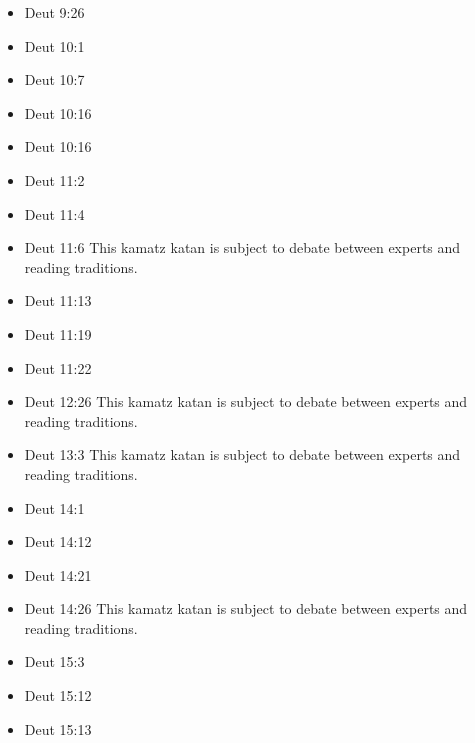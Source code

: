 \documentclass[14pt]{article}
\begin{document}
\begin{multicols}{2}
\begin{itemize}
\item Deut 9:26

\item Deut 10:1

\item Deut 10:7

\item Deut 10:16

\item Deut 10:16

\item Deut 11:2

\item Deut 11:4

\item Deut 11:6 This kamatz katan is subject to debate between experts and reading traditions.

\item Deut 11:13

\item Deut 11:19

\item Deut 11:22

\item Deut 12:26 This kamatz katan is subject to debate between experts and reading traditions.

\item Deut 13:3 This kamatz katan is subject to debate between experts and reading traditions.

\item Deut 14:1

\item Deut 14:12

\item Deut 14:21

\item Deut 14:26 This kamatz katan is subject to debate between experts and reading traditions.

\item Deut 15:3

\item Deut 15:12

\item Deut 15:13


\end{itemize}
\end{multicols}
\end{document}
